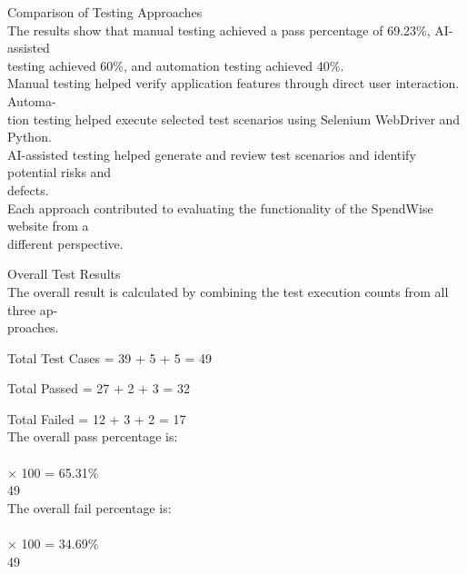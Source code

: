 \documentclass[12pt,a4paper]{report}
\begin{document}
 Comparison of Testing Approaches\\ 

\smallskip
The results show that manual testing achieved a pass percentage of 69.23\%, AI-assisted\\ 
testing achieved 60\%, and automation testing achieved 40\%.\\ 
Manual testing helped verify application features through direct user interaction. Automa-\\ 
tion testing helped execute selected test scenarios using Selenium WebDriver and Python.\\ 
AI-assisted testing helped generate and review test scenarios and identify potential risks and\\ 
defects.\\ 
Each approach contributed to evaluating the functionality of the SpendWise website from a\\ 
different perspective.\\ 

\smallskip

 Overall Test Results\\ 

\smallskip
The overall result is calculated by combining the test execution counts from all three ap-\\ 
proaches.\\ 

\smallskip

\smallskip
Total Test Cases = 39 + 5 + 5 = 49\\ 

\smallskip

\smallskip

\smallskip
Total Passed = 27 + 2 + 3 = 32\\ 

\smallskip

\smallskip

\smallskip
Total Failed = 12 + 3 + 2 = 17\\ 

\smallskip
The overall pass percentage is:\\ 

\\ 
× 100 = 65.31\%\\ 
49\\ 
The overall fail percentage is:\\ 

\\ 
× 100 = 34.69\%\\ 
49\\ 
\end{document}
